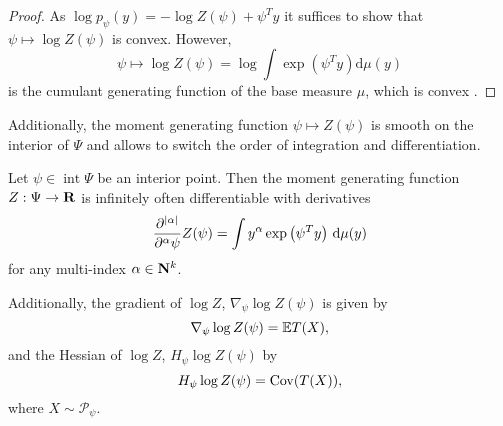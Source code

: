 \begin{proof}
    As $\log p_{\psi}(y) = - \log Z(\psi) + \psi^{T} y$ it suffices to show that $\psi \mapsto \log Z(\psi)$ is convex. However, 
    $$\psi \mapsto \log Z(\psi) = \log \int \exp \left( \psi^{T}y \right) \mathrm d \mu(y)$$ is the cumulant generating function of the base measure $\mu$, which is convex \citep[p. 144f]{Billingsley1995Probabilitya}.
\end{proof}

Additionally, the moment generating function $\psi \mapsto Z(\psi)$ is smooth on the interior of $\Psi$ and allows to switch the order of integration and differentiation.
\begin{theorem}
    \label{thm:logZsmooth}
    Let $\psi \in \operatorname{int} \Psi$ be an interior point. Then the moment generating function $Z: \Psi \to \mathbf R$ is infinitely often differentiable with derivatives 
    $$
        \frac{\partial^{\lvert \alpha \rvert}}{\partial^{\alpha}\psi} Z(\psi) = \int y^{\alpha} \exp \left( \psi^{T} y \right) \,\mathrm d \mu(y)
    $$
    for any multi-index $\alpha \in \mathbf N^{k}$.

    Additionally, the gradient of $\log Z$, $\nabla_{\psi} \log Z(\psi)$ is given by
    $$
        \nabla_{\psi} \log Z(\psi) = \mathbb E T(X),
    $$
    and the Hessian of $\log Z$, $H_{\psi} \log Z(\psi)$ by
    $$
        H_{\psi} \log Z(\psi) = \operatorname{Cov} (T(X)),
    $$
    where $X \sim \mathcal P_{\psi}$.
    
\end{theorem}

